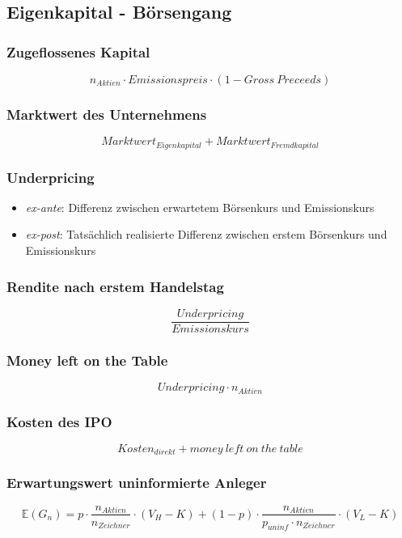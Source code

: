 \subsection{Eigenkapital - Börsengang}

\subsubsection{Zugeflossenes Kapital}
\[n_{Aktien} \cdot Emissionspreis \cdot (1- Gross~Preceeds)\]

\subsubsection{Marktwert des Unternehmens}
\[Marktwert_{Eigenkapital} + Marktwert_{Fremdkapital}\]

\subsubsection{Underpricing}
\begin{itemize}
	\item \textit{ex-ante}: Differenz zwischen erwartetem Börsenkurs und Emissionskurs
	\item \textit{ex-post}: Tatsächlich realisierte Differenz zwischen erstem Börsenkurs und Emissionskurs
\end{itemize}

\subsubsection{Rendite nach erstem Handelstag}
\[\frac{Underpricing}{Emissionskurs}\]

\subsubsection{Money left on the Table}
\[Underpricing \cdot n_{Aktien}\]

\subsubsection{Kosten des IPO}
\[Kosten_{direkt} + money~left~on~the~table\]

\subsubsection{Erwartungswert uninformierte Anleger}
\[\mathbb{E}(G_n) = p \cdot \frac{n_{Aktien}}{n_{Zeichner}} \cdot (V_H - K) + (1-p) \cdot \frac{n_{Aktien}}{p_{uninf} \cdot n_{Zeichner}} \cdot (V_L-K)\]

